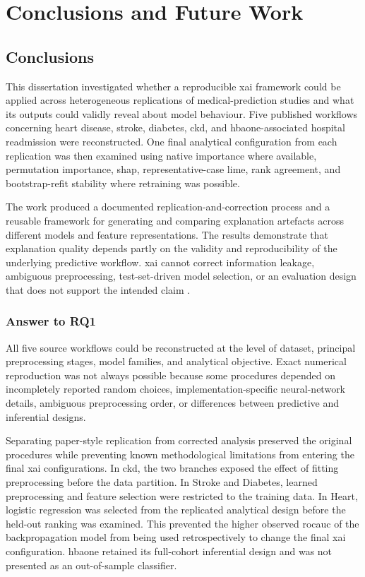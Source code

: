 \chapter{Conclusions and Future Work}
\label{chap:conclusions}

\section{Conclusions}

This dissertation investigated whether a reproducible \gls{xai} framework could be applied across heterogeneous replications of medical-prediction studies and what its outputs could validly reveal about model behaviour. Five published workflows concerning heart disease, stroke, diabetes, \gls{ckd}, and \gls{hbaone}-associated hospital readmission were reconstructed. One final analytical configuration from each replication was then examined using native importance where available, permutation importance, \gls{shap}, representative-case \gls{lime}, rank agreement, and bootstrap-refit stability where retraining was possible.

The work produced a documented replication-and-correction process and a reusable framework for generating and comparing explanation artefacts across different models and feature representations. The results demonstrate that explanation quality depends partly on the validity and reproducibility of the underlying predictive workflow. \gls{xai} cannot correct information leakage, ambiguous preprocessing, test-set-driven model selection, or an evaluation design that does not support the intended claim \citep{collins_tripodai_2024, moons_probastai_2025}.

\subsection{Answer to RQ1}

All five source workflows could be reconstructed at the level of dataset, principal preprocessing stages, model families, and analytical objective. Exact numerical reproduction was not always possible because some procedures depended on incompletely reported random choices, implementation-specific neural-network details, ambiguous preprocessing order, or differences between predictive and inferential designs.

Separating paper-style replication from corrected analysis preserved the original procedures while preventing known methodological limitations from entering the final \gls{xai} configurations. In \gls{ckd}, the two branches exposed the effect of fitting preprocessing before the data partition. In Stroke and Diabetes, learned preprocessing and feature selection were restricted to the training data. In Heart, logistic regression was selected from the replicated analytical design before the held-out ranking was examined. This prevented the higher observed \gls{rocauc} of the backpropagation model from being used retrospectively to change the final \gls{xai} configuration. \gls{hbaone} retained its full-cohort inferential design and was not presented as an out-of-sample classifier.

